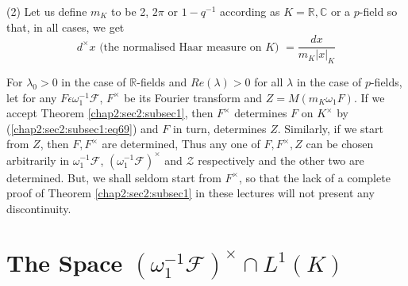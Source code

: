 \begin{Remarks*}
(2) Let us define $m_{K}$ to be 2, $2 \pi$ or $1-q^{-1}$ according
 as $K=\mathbb{R}, \mathbb{C}$ or a $p$-field so that, in all cases, we
 get
\begin{equation*}
d^{\times}x\text{ (the normalised Haar measure on $K$) } =\frac{dx}{m_{K}|x|_{K}}
\end{equation*}

 For $\lambda_{0}>0$ in the case of $\mathbb{R}$-fields and
 $Re(\lambda)>0$ for all $\lambda$ in the case of $p$-fields, let for
 any $F\epsilon \omega_{1}^{-1}\mathscr{F}$, $F^{\times}$ be its Fourier
 transform and $Z=M(m_{K}\omega_{1}F)$. If we accept
 Theorem \ref{chap2:sec2:subsec1},
 then $F^{\times}$ determines $F$ on $K^{\times}$ by
 (\ref{chap2:sec2:subsec1:eq69}) and $F$ in
 turn, determines $Z$. Similarly, if we start from $Z$, then
 $F,F^{\times}$ are determined, Thus any one of $F,F^{\times}, Z$ can be
 chosen arbitrarily in $\omega_{1}^{-1}\mathscr{F}$,
 $(\omega_{1}^{-1}\mathscr{F})^{\times}$ and $\mathscr{Z}$ respectively\pageoriginale
 and the other two are determined. But, we shall seldom start from
 $F^{\times}$, so that the lack of a complete proof of
 Theorem \ref{chap2:sec2:subsec1}  in
 these lectures will not present any discontinuity.
\end{Remarks*}

\section{The Space $(\omega_{1}^{-1}\mathscr{F})^{\times}\cap
  L^{1}(K)$}\label{chap2:sec3} %

\subsection{}\label{chap2:sec3:subsec1} %

